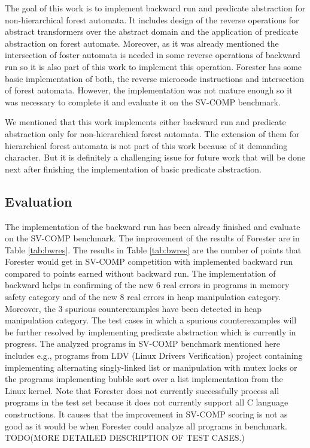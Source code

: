 \documentclass[fleqn,11pt]{ExcelAtFIT} %
\begin{document}
The goal of this work is to implement backward run and predicate abstraction
for non-hierarchical forest automata.
It includes design of the reverse operations for abstract transformers over
the abstract domain and the application of predicate abstraction on forest automate.
Moreover, as it was already mentioned the intersection of foster automata is needed in some reverse
operations of backward run so it is also part of this work to implement this operation.
Forester has some basic implementation of both, the reverse microcode instructions and
intersection of forest automata.
However, the implementation was not mature enough so it was necessary to
complete it and evaluate it on the SV-COMP benchmark.

We mentioned that this work implements either backward run and predicate abstraction only for
non-hierarchical forest automata.
The extension of them for hierarchical forest automata is not part
of this work because of it demanding character.
But it is definitely a challenging issue for future work
that will be done next after finishing the implementation of basic predicate abstraction.

\subsection{Evaluation}

The implementation of the backward run has been already finished and evaluate on the SV-COMP benchmark.
The improvement of the results of Forester are in Table \ref{tab:bwres}.
The results in Table \ref{tab:bwres} are the number of points that Forester would get
in SV-COMP competition with implemented backward run compared to points earned without backward run.
The implementation of backward helps in confirming of the new $6$ real errors in programs in memory safety category and
of the new $8$ real errors in heap manipulation category.
Moreover, the $3$ spurious counterexamples have been detected in heap manipulation category.
The test cases in which a spurious counterexamples will be further resolved by implementing predicate
abstraction which is currently in progress.
The analyzed programs in SV-COMP benchmark mentioned here includes e.g., programs from LDV (Linux Drivers Verification) project
containing implementing alternating singly-linked list or manipulation with mutex locks or the programs
implementing bubble sort over a list implementation from the Linux kernel.
Note that Forester does not currently successfully process all programs in the test set
because it does not currently support all C language constructions.
It causes that the improvement in SV-COMP scoring is not as good as it would be when
Forester could analyze all programs in benchmark.
TODO(MORE DETAILED DESCRIPTION OF TEST CASES.)
\end{document}
